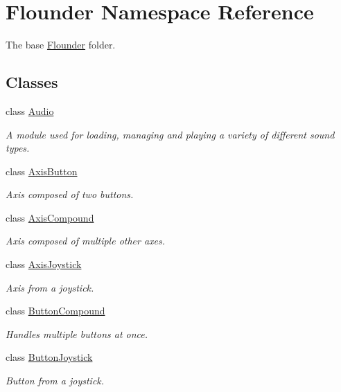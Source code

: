 \hypertarget{namespace_flounder}{}\section{Flounder Namespace Reference}
\label{namespace_flounder}


The base \hyperlink{namespace_flounder}{Flounder} folder.  


\subsection*{Classes}
\begin{DoxyCompactItemize}
\item 
class \hyperlink{class_flounder_1_1_audio}{Audio}
\begin{DoxyCompactList}\small\item\em A module used for loading, managing and playing a variety of different sound types. \end{DoxyCompactList}\item 
class \hyperlink{class_flounder_1_1_axis_button}{Axis\+Button}
\begin{DoxyCompactList}\small\item\em Axis composed of two buttons. \end{DoxyCompactList}\item 
class \hyperlink{class_flounder_1_1_axis_compound}{Axis\+Compound}
\begin{DoxyCompactList}\small\item\em Axis composed of multiple other axes. \end{DoxyCompactList}\item 
class \hyperlink{class_flounder_1_1_axis_joystick}{Axis\+Joystick}
\begin{DoxyCompactList}\small\item\em Axis from a joystick. \end{DoxyCompactList}\item 
class \hyperlink{class_flounder_1_1_button_compound}{Button\+Compound}
\begin{DoxyCompactList}\small\item\em Handles multiple buttons at once. \end{DoxyCompactList}\item 
class \hyperlink{class_flounder_1_1_button_joystick}{Button\+Joystick}
\begin{DoxyCompactList}\small\item\em Button from a joystick. \end{DoxyCompactList}\item 

\end{DoxyCompactItemize}
